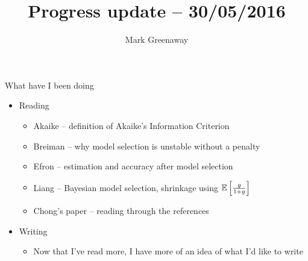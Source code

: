 \documentclass{beamer}
\title{Progress update -- 30/05/2016}
\author{Mark Greenaway}
\begin{document}
\begin{frame}
\titlepage
\end{frame}

\begin{frame}{What have I been doing}
\begin{itemize}
\item Reading
	\begin{itemize}
		\item Akaike -- definition of Akaike's Information Criterion
		\item Breiman -- why model selection is unstable without a penalty
		\item Efron -- estimation and accuracy after model selection
		\item Liang -- Bayesian model selection, shrinkage using $\mathbb{E} \left[\frac{g}{1 + g}\right]$
		\item Chong's paper -- reading through the references
	\end{itemize}
\item Writing
	\begin{itemize}
		\item Now that I've read more, I have more of an idea of what I'd like to write
	\end{itemize}
\end{itemize}
\end{frame}
\end{document}
